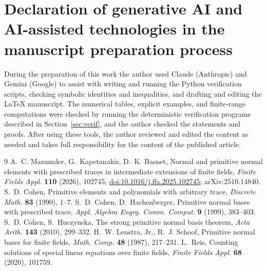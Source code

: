 \documentclass[11pt,a4paper]{amsart}
\theoremstyle{remark}
\begin{document}
\section*{Declaration of generative AI and AI-assisted technologies in the manuscript preparation process}
During the preparation of this work the author used Claude (Anthropic) and Gemini (Google) to assist with
writing and running the Python verification scripts, checking symbolic identities and inequalities, and drafting
and editing the LaTeX manuscript. The numerical tables, explicit examples, and finite-range computations were
checked by running the deterministic verification programs described in Section~\ref{sec:verif}, and the author
checked the statements and proofs. After using these tools, the author reviewed and edited the content as needed
and takes full responsibility for the content of the published article.
\begin{thebibliography}{9}
 A.~C. Mazumder, G.~Kapetanakis, D.~K. Basnet, Normal and primitive normal elements with
prescribed traces in intermediate extensions of finite fields, \emph{Finite Fields Appl.} \textbf{110} (2026),
102745, \href{https://doi.org/10.1016/j.ffa.2025.102745}{doi:10.1016/j.ffa.2025.102745}; arXiv:2510.14840.
 S.~D. Cohen, Primitive elements and polynomials with arbitrary trace, \emph{Discrete Math.}
\textbf{83} (1990), 1--7.
 S.~D. Cohen, D.~Hachenberger, Primitive normal bases with prescribed trace, \emph{Appl. Algebra
Engrg. Comm. Comput.} \textbf{9} (1999), 383--403.
 S.~D. Cohen, S.~Huczynska, The strong primitive normal basis theorem, \emph{Acta Arith.}
\textbf{143} (2010), 299--332.
 H.~W. Lenstra, Jr., R.~J. Schoof, Primitive normal bases for finite fields, \emph{Math. Comp.}
\textbf{48} (1987), 217--231.
 L.~Reis, Counting solutions of special linear equations over finite fields, \emph{Finite
Fields Appl.} \textbf{68} (2020), 101759.
\end{thebibliography}
\end{document}
